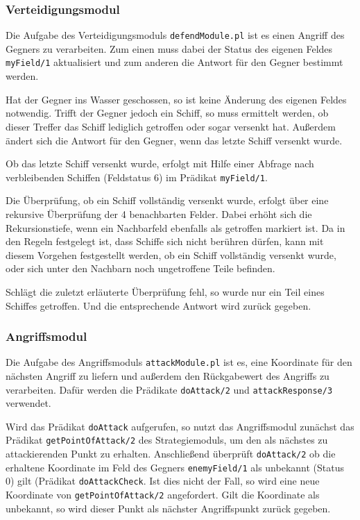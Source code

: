 \subsubsection{Verteidigungsmodul} \label{sec:defendModule}
	Die Aufgabe des Verteidigungsmoduls \texttt{defendModule.pl} ist es einen Angriff des Gegners zu verarbeiten.
	Zum einen muss dabei der Status des eigenen Feldes \texttt{myField/1} aktualisiert 
	und zum anderen die Antwort für den Gegner bestimmt werden.
	
	Hat der Gegner ins Wasser geschossen, so ist keine Änderung des eigenen Feldes notwendig. Trifft der Gegner jedoch ein Schiff,
	so muss ermittelt werden, ob dieser Treffer das Schiff lediglich getroffen oder sogar versenkt hat. Außerdem ändert sich die Antwort
	für den Gegner, wenn das letzte Schiff versenkt wurde.
	
	Ob das letzte Schiff versenkt wurde, erfolgt mit Hilfe einer Abfrage nach verbleibenden Schiffen (Feldstatus 6) im Prädikat \texttt{myField/1}.
	
	Die Überprüfung, ob ein Schiff vollständig versenkt wurde, erfolgt über eine rekursive Überprüfung der 4 benachbarten Felder.
	Dabei erhöht sich die Rekursionstiefe, wenn ein Nachbarfeld ebenfalls als getroffen markiert ist. 
	Da in den Regeln festgelegt ist, dass Schiffe sich nicht berühren dürfen, kann mit diesem Vorgehen festgestellt werden, ob ein Schiff
	vollständig versenkt wurde, oder sich unter den Nachbarn noch ungetroffene Teile befinden.
	
	Schlägt die zuletzt erläuterte Überprüfung fehl, so wurde nur ein Teil eines Schiffes getroffen. Und die entsprechende Antwort wird zurück 
	gegeben.
	
	
\subsubsection{Angriffsmodul} \label{sec:attackModule}
	Die Aufgabe des Angriffsmoduls \texttt{attackModule.pl} ist es, eine Koordinate für den nächsten Angriff zu liefern und außerdem den 
	Rückgabewert des Angriffs zu verarbeiten. 
	Dafür werden die Prädikate \texttt{doAttack/2} und \texttt{attackResponse/3} verwendet. 
	
	Wird das Prädikat \texttt{doAttack} aufgerufen, so nutzt das Angriffsmodul zunächst das Prädikat \texttt{getPointOfAttack/2} des
	Strategiemoduls, um den als nächstes zu attackierenden Punkt zu erhalten. Anschließend überprüft \texttt{doAttack/2} 
	ob die erhaltene Koordinate im Feld des Gegners \texttt{enemyField/1} als unbekannt (Status 0) gilt (Prädikat \texttt{doAttackCheck}. 
	Ist dies nicht der Fall, so wird eine neue Koordinate von \texttt{getPointOfAttack/2} angefordert. 
	Gilt die Koordinate als unbekannt, so wird dieser Punkt als nächster Angriffspunkt zurück gegeben.
	
